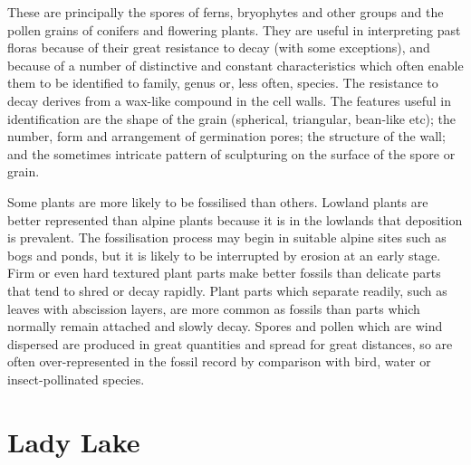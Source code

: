 These are principally the spores of ferns, bryophytes and other groups and the pollen grains of conifers and flowering plants.
They are useful in interpreting past floras because of their great resistance to decay (with some exceptions), and because of a number of distinctive and constant characteristics which often enable them to be identified to family, genus or, less often, species.
The resistance to decay derives from a wax-like compound in the cell walls.
The features useful in identification are the shape of the grain (spherical, triangular, bean-like etc); the number, form and arrangement of germination pores; the structure of the wall; and the sometimes intricate pattern of sculpturing on the surface of the spore or grain.

Some plants are more likely to be fossilised than others.
Lowland plants are better represented than alpine plants because it is in the lowlands that deposition is prevalent.
The fossilisation process may begin in suitable alpine sites such as bogs and ponds, but it is likely to be interrupted by erosion at an early stage.
Firm or even hard textured plant parts make better fossils than delicate parts that tend to shred or decay rapidly.
Plant parts which separate readily, such as leaves with abscission layers, are more common as fossils than parts which normally remain attached and slowly decay.
Spores and pollen which are wind dispersed are produced in great quantities and spread for great distances, so are often over-represented in the fossil record by comparison with bird, water or insect-pollinated species.

\section{Lady Lake}

